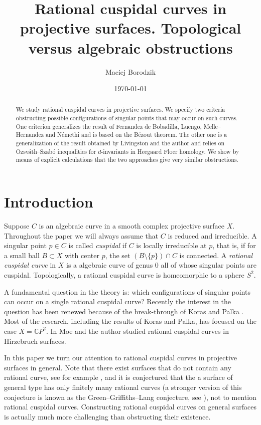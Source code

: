 \documentclass[11pt]{amsart}
\title[Rational cuspidal curves in projective surfaces]{Rational cuspidal curves in projective surfaces. Topological versus algebraic obstructions}
\author{Maciej Borodzik}
\date{\today}
\numberwithin{equation}{section}
\theoremstyle{plain}
\theoremstyle{definition}
\begin{document}
\begin{abstract}
We study rational cuspidal curves in  projective surfaces. We specify two criteria obstructing possible
configurations of singular points that may occur on such curves. 
One criterion  generalizes the result of Fernandez de Bobadilla, Luengo, Melle--Hernandez
and N\'emethi and is based on the B\'ezout theorem. The other one is a generalization of the result obtained by Livingston and the 
author and relies on Ozsv\'ath--Szab\'o inequalities for $d$-invariants in Heegaard Floer homology. 
We show by means of explicit calculations that the two approaches give very similar obstructions.
\end{abstract}
\maketitle

\section{Introduction}
Suppose $C$ is an algebraic curve in a smooth complex projective surface $X$. Throughout the paper we will always assume that $C$
is reduced and irreducible. A singular point $p\in C$ is called \emph{cuspidal} if $C$ is locally irreducible at $p$, that is,
if for a small ball $B\subset X$ with center $p$, the set $(B\setminus\{p\})\cap C$ is connected. A \emph{rational cuspidal curve}
in $X$ is a algebraic curve of genus $0$ all of whose singular points are cuspidal. Topologically, a rational cuspidal curve
is homeomorphic to a sphere $S^2$.

A fundamental question in the theory is: 
which configurations of singular points can occur on a single rational cuspidal curve? Recently the interest 
in the question has been renewed because of the break-through of Koras and Palka \cite{KP,Pal0,Pal}.
Most of the research, including the results of Koras and Palka,
has focused on the case $X={\mathbb C} P^2$. In \cite{BM} Moe and the author studied rational cuspidal curves in Hirzebruch surfaces.

In this paper we turn our attention to rational cuspidal curves in projective surfaces in general. Note that there exist surfaces that do not 
contain
any rational curve, see for example \cite{Xu}, 
and it is conjectured that the a surface of general type has only finitely many rational curves
(a stronger version of this conjecture is known as the Green--Griffiths--Lang conjecture, see \cite{Voi}),
not to mention rational cuspidal curves. Constructing rational cuspidal curves on general surfaces is actually much more
challenging than obstructing their existence.
\end{document}
